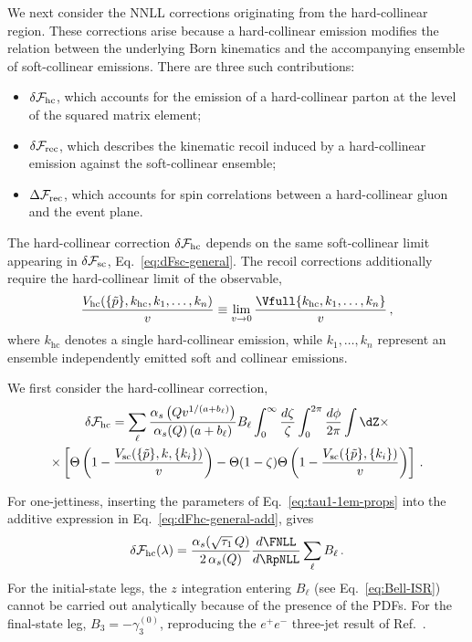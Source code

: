 We next consider the NNLL corrections originating from the
hard-collinear region. These corrections arise because a hard-collinear
emission modifies the relation between the underlying Born kinematics
and the accompanying ensemble of soft-collinear emissions. There are
three such contributions:
\begin{itemize}
  \item $\delta\mathcal{F}_{\rm hc}$, which accounts for the emission of
  a hard-collinear parton at the level of the squared matrix element;
  \item $\delta\mathcal{F}_{\rm rec}$, which describes the kinematic
  recoil induced by a hard-collinear emission against the
  soft-collinear ensemble;
  \item $\Delta\mathcal{F}_{\rm rec}$, which accounts for spin
  correlations between a hard-collinear gluon and the event plane.
\end{itemize}
The hard-collinear correction $\delta\mathcal{F}_{\rm hc}$ depends on the
same soft-collinear limit appearing in $\delta\mathcal{F}_{\rm sc}$,
Eq.~\eqref{eq:dFsc-general}. The recoil corrections additionally require
the hard-collinear limit of the observable,
\begin{equation}
  \label{eq:Vhc}
  \frac{V_{\mathrm{hc}}(\{\tilde{p}\}, k_{\mathrm{hc}}, k_1,\dots,k_n)}{v}\equiv \lim_{v\to 0}\frac{\Vfull{k_{\mathrm{hc}}, k_1,\dots,k_n}}{v}\,,
\end{equation}
where $k_{\mathrm{hc}}$ denotes a single hard-collinear emission,
while $k_1,\ldots,k_n$ represent an ensemble independently emitted 
 soft and collinear emissions.
 
We first consider the hard-collinear correction,
\begin{multline}
  \label{eq:dFhc-general}
   \delta\mathcal{F}_{\rm hc}=\sum_\ell \frac{\alpha_s\left(Qv^{1/(a+b_\ell)}\right)}{\alpha_s(Q)\left(a+b_\ell\right)}B_\ell \int_0^{\infty}\frac{d\zeta}{\zeta}\int_0^{2\pi}\frac{d\phi}{2\pi}
 \int \dZ  \times\\ \times  \left[\Theta\left(1-\frac{V_{\mathrm{sc}}(\{\tilde{p}\},k,\{k_i\})}{v}\right) -\Theta(1-\zeta)\Theta\left(1-\frac{V_{\mathrm{sc}}(\{\tilde{p}\},\{k_i\})}{v}\right)\right]\,.
\end{multline}

For one-jettiness, inserting the parameters of
Eq.~\eqref{eq:tau1-1em-props} into the additive expression in
Eq.~\eqref{eq:dFhc-general-add}, gives
 \begin{equation}
  \label{eq:dFhc-tau_1}
    \delta \mathcal{F}_{\rm hc}(\lambda) = \frac{\alpha_s(\sqrt{\tau_1}\,Q)}{2\,\alpha_s(Q)}\frac{d\FNLL}{d\RpNLL} \sum_{\ell}B_\ell\,.
  \end{equation}
For the initial-state legs, the $z$ integration entering
$B_\ell$ (see Eq.~\eqref{eq:Bell-ISR}) cannot be carried out
analytically because of the presence of the PDFs. For the
final-state leg,
$B_3=-\gamma_3^{(0)}$, reproducing the
$e^+e^-$ three-jet result of Ref.~\cite{Arpino:2019ozn}.

